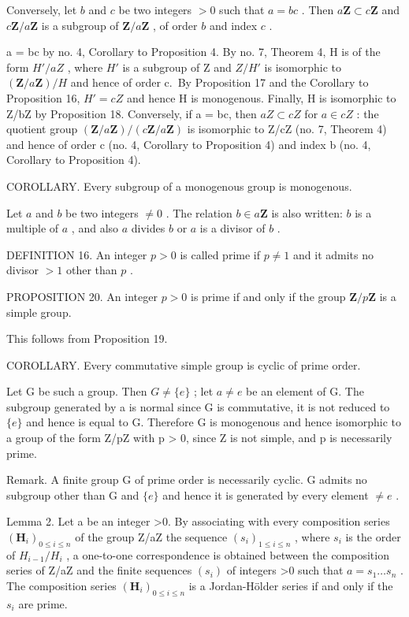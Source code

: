 Conversely, let \(b\) and \(c\) be two integers \(>0\) such that \(a = bc\) . Then \(a\mathbf{Z} \subset c\mathbf{Z}\) and \(c\mathbf{Z}/a\mathbf{Z}\) is a subgroup of \(\mathbf{Z}/a\mathbf{Z}\) , of order \(b\) and index \(c\) .

a = bc by no. 4, Corollary to Proposition 4. By no. 7, Theorem 4, H is of the form \(H'/aZ\) , where \(H'\) is a subgroup of Z and \(Z/H'\) is isomorphic to \((\mathbf{Z}/a\mathbf{Z})/H\) and hence of order c.~By Proposition 17 and the Corollary to Proposition 16, \(H' = cZ\) and hence H is monogenous. Finally, H is isomorphic to Z/bZ by Proposition 18. Conversely, if a = bc, then \(aZ \subset cZ\) for \(a \in cZ\) : the quotient group \((\mathbf{Z}/a\mathbf{Z})/(c\mathbf{Z}/a\mathbf{Z})\) is isomorphic to Z/cZ (no. 7, Theorem 4) and hence of order c (no. 4, Corollary to Proposition 4) and index b (no. 4, Corollary to Proposition 4).

COROLLARY. Every subgroup of a monogenous group is monogenous.

Let \(a\) and \(b\) be two integers \(\neq 0\) . The relation \(b \in a\mathbf{Z}\) is also written: \(b\) is a multiple of \(a\) , and also \(a\) divides \(b\) or \(a\) is a divisor of \(b\) .

DEFINITION 16. An integer \(p > 0\) is called prime if \(p \neq 1\) and it admits no divisor \(> 1\) other than \(p\) .

PROPOSITION 20. An integer \(p > 0\) is prime if and only if the group \(\mathbf{Z} / p\mathbf{Z}\) is a simple group.

This follows from Proposition 19.

COROLLARY. Every commutative simple group is cyclic of prime order.

Let G be such a group. Then \(G \neq \{e\}\) ; let \(a \neq e\) be an element of G. The subgroup generated by a is normal since G is commutative, it is not reduced to \(\{e\}\) and hence is equal to G. Therefore G is monogenous and hence isomorphic to a group of the form Z/pZ with p \textgreater{} 0, since Z is not simple, and p is necessarily prime.

Remark. A finite group G of prime order is necessarily cyclic. G admits no subgroup other than G and \(\{e\}\) and hence it is generated by every element \(\neq e\) .

Lemma 2. Let a be an integer \textgreater0. By associating with every composition series \((\mathbf{H}_{i})_{0\leqslant i\leqslant n}\) of the group Z/aZ the sequence \((s_{i})_{1\leqslant i\leqslant n}\) , where \(s_{i}\) is the order of \(H_{i-1}/H_{i}\) , a one-to-one correspondence is obtained between the composition series of Z/aZ and the finite sequences \((s_{i})\) of integers \textgreater0 such that \(a=s_{1}\ldots s_{n}\) . The composition series \((\mathbf{H}_{i})_{0\leqslant i\leqslant n}\) is a Jordan-Hölder series if and only if the \(s_{i}\) are prime.


